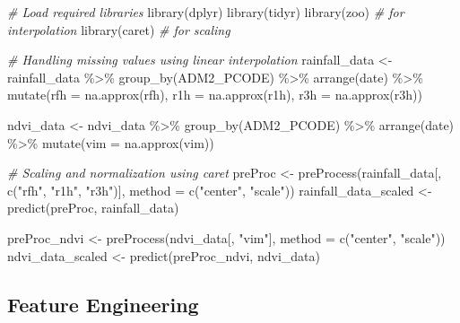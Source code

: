 \documentclass[
]{article}
\newenvironment{Shaded}{}{}
\newcommand{\AttributeTok}[1]{\textcolor[rgb]{0.49,0.56,0.16}{#1}}
\newcommand{\CommentTok}[1]{\textcolor[rgb]{0.38,0.63,0.69}{\textit{#1}}}
\newcommand{\FunctionTok}[1]{\textcolor[rgb]{0.02,0.16,0.49}{#1}}
\newcommand{\NormalTok}[1]{#1}
\newcommand{\OtherTok}[1]{\textcolor[rgb]{0.00,0.44,0.13}{#1}}
\newcommand{\SpecialCharTok}[1]{\textcolor[rgb]{0.25,0.44,0.63}{#1}}
\newcommand{\StringTok}[1]{\textcolor[rgb]{0.25,0.44,0.63}{#1}}
\begin{document}
\begin{Shaded}
\begin{Highlighting}[]
\CommentTok{\# Load required libraries}
\FunctionTok{library}\NormalTok{(dplyr)}
\FunctionTok{library}\NormalTok{(tidyr)}
\FunctionTok{library}\NormalTok{(zoo) }\CommentTok{\# for interpolation}
\FunctionTok{library}\NormalTok{(caret) }\CommentTok{\# for scaling}

\CommentTok{\# Handling missing values using linear interpolation}
\NormalTok{rainfall\_data }\OtherTok{\textless{}{-}}\NormalTok{ rainfall\_data }\SpecialCharTok{\%\textgreater{}\%}
  \FunctionTok{group\_by}\NormalTok{(ADM2\_PCODE) }\SpecialCharTok{\%\textgreater{}\%}
  \FunctionTok{arrange}\NormalTok{(date) }\SpecialCharTok{\%\textgreater{}\%}
  \FunctionTok{mutate}\NormalTok{(}\AttributeTok{rfh =} \FunctionTok{na.approx}\NormalTok{(rfh),}
         \AttributeTok{r1h =} \FunctionTok{na.approx}\NormalTok{(r1h),}
         \AttributeTok{r3h =} \FunctionTok{na.approx}\NormalTok{(r3h))}

\NormalTok{ndvi\_data }\OtherTok{\textless{}{-}}\NormalTok{ ndvi\_data }\SpecialCharTok{\%\textgreater{}\%}
  \FunctionTok{group\_by}\NormalTok{(ADM2\_PCODE) }\SpecialCharTok{\%\textgreater{}\%}
  \FunctionTok{arrange}\NormalTok{(date) }\SpecialCharTok{\%\textgreater{}\%}
  \FunctionTok{mutate}\NormalTok{(}\AttributeTok{vim =} \FunctionTok{na.approx}\NormalTok{(vim))}

\CommentTok{\# Scaling and normalization using caret}
\NormalTok{preProc }\OtherTok{\textless{}{-}} \FunctionTok{preProcess}\NormalTok{(rainfall\_data[, }\FunctionTok{c}\NormalTok{(}\StringTok{"rfh"}\NormalTok{, }\StringTok{"r1h"}\NormalTok{, }\StringTok{"r3h"}\NormalTok{)], }
                      \AttributeTok{method =} \FunctionTok{c}\NormalTok{(}\StringTok{"center"}\NormalTok{, }\StringTok{"scale"}\NormalTok{))}
\NormalTok{rainfall\_data\_scaled }\OtherTok{\textless{}{-}} \FunctionTok{predict}\NormalTok{(preProc, rainfall\_data)}

\NormalTok{preProc\_ndvi }\OtherTok{\textless{}{-}} \FunctionTok{preProcess}\NormalTok{(ndvi\_data[, }\StringTok{"vim"}\NormalTok{], }\AttributeTok{method =} \FunctionTok{c}\NormalTok{(}\StringTok{"center"}\NormalTok{, }\StringTok{"scale"}\NormalTok{))}
\NormalTok{ndvi\_data\_scaled }\OtherTok{\textless{}{-}} \FunctionTok{predict}\NormalTok{(preProc\_ndvi, ndvi\_data)}
\end{Highlighting}
\end{Shaded}

\subsection{Feature Engineering}\label{feature-engineering}
\end{document}
